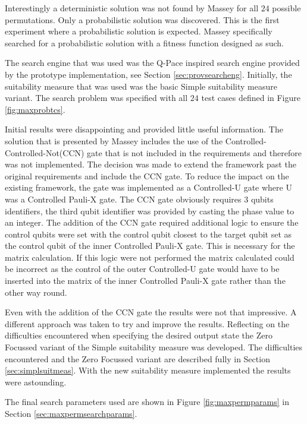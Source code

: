 Interestingly a deterministic solution was not found by Massey for all $24$ possible permutations.
Only a probabilistic solution was discovered.
This is the first experiment where a probabilistic solution is expected.
Massey specifically searched for a probabilistic solution with a fitness function designed as such.

The search engine that was used was the Q-Pace inspired search engine provided by the prototype implementation, see Section \ref{sec:provsearcheng}.
Initially, the suitability measure that was used was the basic Simple suitability measure variant.
The search problem was specified with all $24$ test cases defined in Figure \ref{fig:maxprobtcs}.

Initial results were disappointing and provided little useful information.
The solution that is presented by Massey includes the use of the Controlled-Controlled-Not(CCN) gate that is not included in the requirements and therefore was not implemented.
The decision was made to extend the framework past the original requirements and include the CCN gate.
To reduce the impact on the existing framework, the gate was implemented as a Controlled-U gate where U was a Controlled Pauli-X gate.
The CCN gate obviously requires 3 qubits identifiers, the third qubit identifier was provided by casting the phase value to an integer.
The addition of the CCN gate required additional logic to ensure the control qubits were set with the control qubit closest to the target qubit set as the control qubit of the inner Controlled Pauli-X gate.
This is necessary for the matrix calculation.
If this logic were not performed the matrix calculated could be incorrect as the control of the outer Controlled-U gate would have to be inserted into the matrix of the inner Controlled Pauli-X gate rather than the other way round.

Even with the addition of the CCN gate the results were not that impressive.
A different approach was taken to try and improve the results.
Reflecting on the difficulties encountered when specifying the desired output state the Zero Focussed variant of the Simple suitability measure was developed.
The difficulties encountered and the Zero Focussed variant are described fully in Section \ref{sec:simplsuitmeas}.
With the new suitability measure implemented the results were astounding.

The final search parameters used are shown in Figure \ref{fig:maxpermparams} in Section \ref{sec:maxpermsearchparams}.

